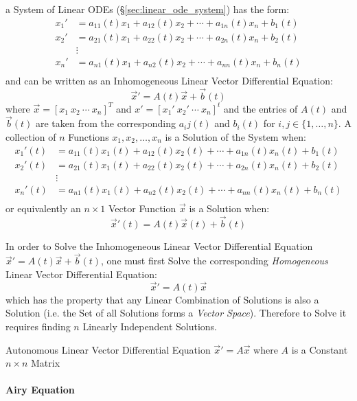 a System of Linear ODEs (\S\ref{sec:linear_ode_system}) has the form:
\begin{align*}
  x_1' & = a_{11}(t)x_1 + a_{12}(t)x_2 + \cdots + a_{1n}(t)x_n + b_1(t) \\
  x_2' & = a_{21}(t)x_1 + a_{22}(t)x_2 + \cdots + a_{2n}(t)x_n + b_2(t) \\
    & \vdots \\
  x_n' & = a_{n1}(t)x_1 + a_{n2}(t)x_2 + \cdots + a_{nn}(t)x_n + b_n(t) \\
\end{align*}
and can be written as an Inhomogeneous Linear Vector Differential Equation:
\[
  \vec{x}' = A(t)\vec{x} + \vec{b}(t)
\]
where $\vec{x} = [x_1\ x_2\ \cdots\ x_n]^T$ and $x' =
[x_1'\ x_2'\ \cdots\ x_n]^t$ and the entries of $A(t)$ and $\vec{b}(t)$ are
taken from the corresponding $a_ij(t)$ and $b_i(t)$ for $i,j \in
\{1,\ldots,n\}$.
A collection of $n$ Functions $x_1, x_2, \ldots, x_n$ is a Solution of the
System when:
\begin{align*}
  x_1'(t) & = a_{11}(t)x_1(t) + a_{12}(t)x_2(t) + \cdots +
    a_{1n}(t)x_n(t) + b_1(t) \\
  x_2'(t) & = a_{21}(t)x_1(t) + a_{22}(t)x_2(t) + \cdots +
    a_{2n}(t)x_n(t) + b_2(t) \\
    & \vdots \\
  x_n'(t) & = a_{n1}(t)x_1(t) + a_{n2}(t)x_2(t) + \cdots +
    a_{nn}(t)x_n(t) + b_n(t) \\
\end{align*}
or equivalently an $n\times{1}$ Vector Function $\vec{x}$ is a Solution when:
\[
  \vec{x}'(t) = A(t)\vec{x}(t) + \vec{b}(t)
\]

In order to Solve the Inhomogeneous Linear Vector Differential Equation
$\vec{x}' = A(t)\vec{x} + \vec{b}(t)$, one must first Solve the corresponding
\emph{Homogeneous} Linear Vector Differential Equation:
\[
  \vec{x}' = A(t)\vec{x}
\]
which has the property that any Linear Combination of Solutions is also a
Solution (i.e. the Set of all Solutions forms a \emph{Vector Space}). Therefore
to Solve it requires finding $n$ Linearly Independent Solutions.

Autonomous Linear Vector Differential Equation $\vec{x}' = A\vec{x}$ where $A$
is a Constant $n\times{n}$ Matrix



\paragraph{Airy Equation}\label{sec:airy_equation}\hfill


